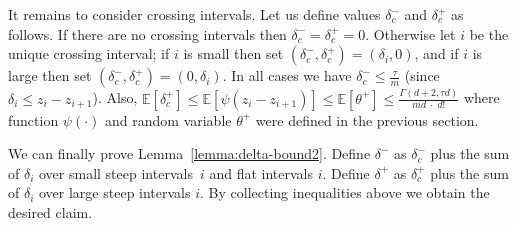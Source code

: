 \documentclass[final,12pt]{colt2018}
\def\E{{\mathbb E}}
\begin{document}
It remains to consider  crossing intervals.
Let us define values $\delta_c^-$ and $\delta_c^+$ as follows.
If there are no crossing intervals then $\delta_c^-=\delta_c^+=0$.
Otherwise let $i$ be the unique crossing interval;
if $i$ is small then set $(\delta_c^-,\delta_c^+)=(\delta_i,0)$,
and if $i$ is large then set $(\delta_c^-,\delta_c^+)=(0,\delta_i)$.
In all cases we have $\delta_c^-\le \frac{\tau}m$ (since $\delta_i\le z_i-z_{i+1}$).
Also, $\E[\delta_c^+]\le \E[\psi(z_i-z_{i+1})]\le\E[\theta^+]\le \frac{\Gamma(d+2,\tau d)}{md\;\cdot\; d!}$
where function $\psi(\cdot)$ and random variable $\theta^+$ were defined in the previous section.


We can finally prove Lemma~\ref{lemma:delta-bound2}. 
Define $\delta^-$ as $\delta_c^-$ plus the sum of $\delta_i$ over small steep intervals~$i$ and flat intervals $i$.
Define $\delta^+$ as $\delta_c^+$ plus the sum of $\delta_i$ over large steep intervals $i$.
By collecting inequalities above we obtain the desired claim.



\end{document}
